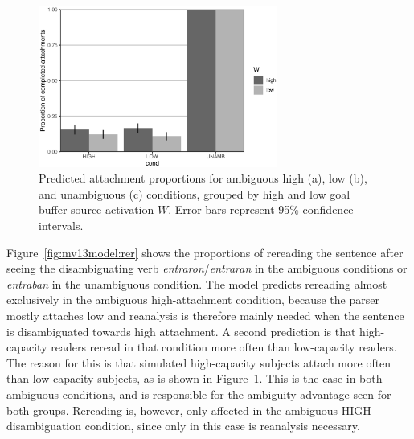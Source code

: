 \documentclass{cambridge7A}\usepackage[]{graphicx}\usepackage[]{color}
\newenvironment{knitrout}{}{} %
\begin{document}
\begin{figure}[!htbp]
\centering
%
\begin{knitrout}
\color{fgcolor}

{\centering \includegraphics[width=0.7\textwidth]{figures/fig-mv13modelatt-1} 

}



\end{knitrout}
%
  \caption[Predicted attachment proportions by source activation at ambiguous and unambiguous attachments.]{Predicted attachment proportions for ambiguous high (a), low (b), and unambiguous (c) conditions, grouped by high and low goal buffer source activation $W$. Error bars represent 95\% confidence intervals.}
  \label{fig:mv13model:att}
\end{figure}

Figure~\ref{fig:mv13model:rer} shows the proportions of rereading the sentence after seeing the disambiguating verb \textit{entraron}/\textit{entraran} in the ambiguous conditions or \textit{entraban} in the unambiguous condition. The model predicts rereading almost exclusively in the ambiguous high-attachment condition, because the parser mostly attaches low and reanalysis is therefore mainly needed when the sentence is disambiguated towards high attachment. A second prediction is that high-capacity readers reread in that condition more often than low-capacity readers. 
The reason for this is that simulated high-capacity subjects attach more often than low-capacity subjects, as is shown in Figure~\ref{fig:mv13model:att}. This is the case in both ambiguous conditions, and is responsible for the ambiguity advantage seen for both groups. Rereading is, however, only affected in the ambiguous HIGH-disambiguation condition, since only in this case is reanalysis necessary. 
\end{document}
